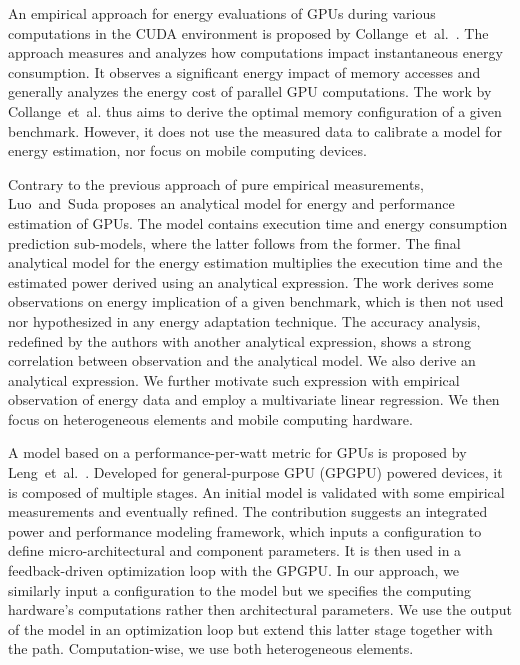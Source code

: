 An empirical approach for energy evaluations of GPUs during various computations in the CUDA environment is proposed by Collange~et~al.~\citep{collange2009power}. The approach measures and analyzes how computations impact instantaneous energy consumption. It observes a significant energy impact of memory accesses and generally analyzes the energy cost of parallel GPU computations. The work by Collange~et~al. thus aims to derive the optimal memory configuration of a given benchmark. However, it does not use the measured data to calibrate a model for energy estimation, nor focus on mobile computing devices.

Contrary to the previous approach of pure empirical measurements, Luo~and~Suda\citep{luo2011performance} proposes an analytical model for energy and performance estimation of GPUs. The model contains execution time and energy consumption prediction sub-models, where the latter follows from the former. The final analytical model for the energy estimation multiplies the execution time and the estimated power derived using an analytical expression. The work derives some observations on energy implication of a given benchmark, which is then not used nor hypothesized in any energy adaptation technique. The accuracy analysis, redefined by the authors with another analytical expression, shows a strong correlation between observation and the analytical model. We also derive an analytical expression. We further motivate such expression with empirical observation of energy data and employ a multivariate linear regression. We then focus on heterogeneous elements and mobile computing hardware.

A model based on a performance-per-watt metric for GPUs is proposed by Leng~et~al.~\citep{leng2013gpuwattch}. Developed for general-purpose GPU (GPGPU) powered devices, it is composed of multiple stages. An initial model is validated with some empirical measurements and eventually refined.  The contribution suggests an integrated power and performance modeling framework, which inputs a configuration to define micro-architectural and component parameters. It is then used in a feedback-driven optimization loop with the GPGPU. In our approach, we similarly input a configuration to the model but we specifies the computing hardware's computations rather then architectural parameters. We use the output of the model in an optimization loop but extend this latter stage together with the path. Computation-wise, we use both heterogeneous elements.

